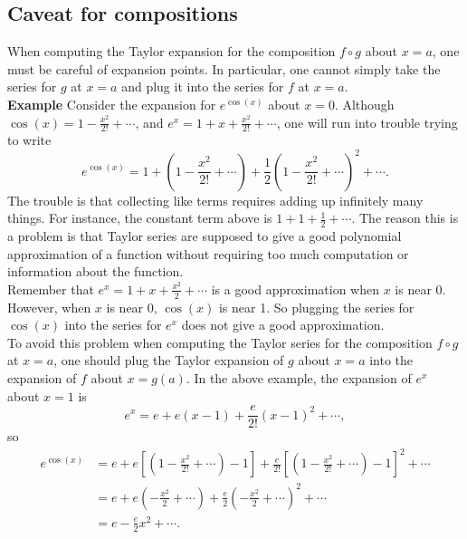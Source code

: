 \documentclass[twoside,openright,titlepage,a4paper]{book}
\begin{document}
\begin{sloppypar}
\subsection{Caveat for compositions}
When computing the Taylor expansion for the composition $f \circ g$ about $x=a$, one must be careful of expansion points. In particular, one cannot simply take the series for $g$ at $x=a$ and plug it into the series for $f$ at $x=a$.\\
\textbf{Example} Consider the expansion for $e^{\cos(x)}$ about $x=0$. Although $\cos(x) = 1-\frac{x^2}{2!} +\dotsb$, and $e^x = 1+x+\frac{x^2}{2!}+\dotsb$, one will run into trouble trying to write
\begin{equation*}
e^{\cos(x)} = 1+(1-\frac{x^2}{2!} +\dotsb) + \frac{1}{2}(1-\frac{x^2}{2!} +\dotsb)^2 + \dotsb.
\end{equation*}
The trouble is that collecting like terms requires adding up infinitely many things. For instance, the constant term above is $1+1+\frac{1}{2}+\dotsb$. The reason this is a problem is that Taylor series are supposed to give a good polynomial approximation of a function without requiring too much computation or information about the function.\\
Remember that $e^x = 1+x+\frac{x^2}{2}+\dotsb$ is a good approximation when $x$ is near 0. However, when $x$ is near 0, $\cos(x)$ is near 1. So plugging the series for $\cos(x)$ into the series for $e^x$ does not give a good approximation. \\
To avoid this problem when computing the Taylor series for the composition $f \circ g$ at $x=a$, one should plug the Taylor expansion of $g$ about $x=a$ into the expansion of $f$ about $x=g(a)$. In the above example, the expansion of $e^x$ about $x=1$ is
\begin{equation*}
e^x = e + e(x-1) + \frac{e}{2!}(x-1)^2 + \dotsb,
\end{equation*}
so
\begin{align*}
e^{\cos(x)} &= e + e\left[\left(1-\frac{x^2}{2!}+\dotsb\right)-1\right] + \frac{e}{2!}\left[\left(1-\frac{x^2}{2!}+\dotsb\right)-1\right]^2 + \dotsb \\
&= e + e(-\frac{x^2}{2} + \dotsb) + \frac{e}{2}(-\frac{x^2}{2}+\dotsb)^2 + \dotsb \\
&= e - \frac{e}{2}x^2 + \dotsb.
\end{align*}

\end{sloppypar}
\end{document}
